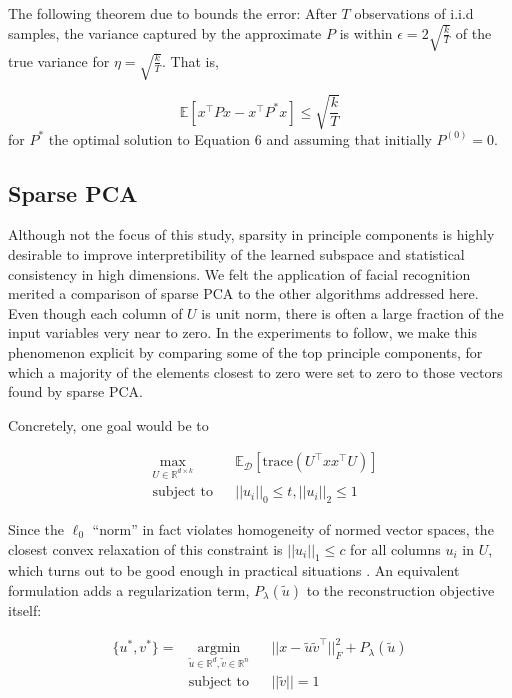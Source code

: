 \documentclass[11pt,letterpaper]{article}
\begin{document}
The following theorem due to \cite{Arora2} bounds the error: After $T$ observations of i.i.d samples, the variance captured by the approximate $P$ is within $\epsilon = 2\sqrt{\frac{k}{T}}$ of the true variance for $\eta = \sqrt{\frac{k}{T}}$. That is, 

\begin{equation}
\mathbb{E}[x^{\top}Px - x^{\top}P^*x] \leq \sqrt{\frac{k}{T}}
\end{equation}
for $P^*$ the optimal solution to Equation 6 and assuming that initially $P^{(0)} = 0$. 


\subsection{Sparse PCA}

Although not the focus of this study, sparsity in principle components is highly desirable to improve interpretibility of the learned subspace and statistical consistency in high dimensions. We felt the application of facial recognition merited a comparison of sparse PCA to the other algorithms addressed here. Even though each column of $U$ is unit norm, there is often a large fraction of the input variables very near to zero. In the experiments to follow, we make this phenomenon explicit by comparing some of the top principle components, for which a majority of the elements closest to zero were set to zero to those vectors found by sparse PCA.

Concretely, one goal would be to

\begin{equation}
\begin{aligned}
& \underset{U \in \mathbb{R}^{d \times k}}{\text{max}}
& & \mathbb{E}_{\mathcal{D}}\left[\text{trace}\left(U^{\top}xx^{\top}U\right)\right] \\
& \text{subject to}
& & ||u_i||_0 \leq t, ||u_i||_2 \leq 1
\end{aligned}
\end{equation}

Since the $\ell_0$ ``norm'' in fact violates homogeneity of normed vector spaces, the closest convex relaxation of this constraint is $||u_i||_1 \leq c$ for all columns $u_i$ in $U$, which turns out to be good enough in practical situations \cite{zou}. An equivalent formulation adds a regularization term, $P_{\lambda}(\tilde{u})$ to the reconstruction objective itself:

\begin{equation}
\begin{aligned}
\{u^*, v^*\} = & \underset{\tilde{u} \in \mathbb{R}^d, \tilde{v} \in \mathbb{R}^{n}}{\text{argmin}}
& & ||x - \tilde{u}\tilde{v}^{\top}||_F^2 + P_{\lambda}(\tilde{u})\\
& \text{subject to}
& & ||\tilde{v}|| = 1
\end{aligned}
\end{equation}
\end{document}
